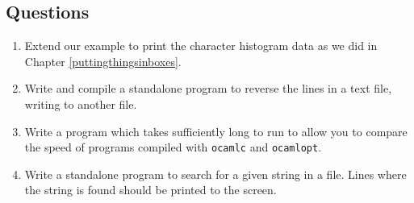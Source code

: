 \documentclass[]{book}
\begin{document}
\clearpage
\section*{Questions}

\begin{enumerate}
  \item Extend our example to print the character histogram data as we did in Chapter \ref{puttingthingsinboxes}. 
  \item Write and compile a standalone program to reverse the lines in a text file, writing to another file.
  \item Write a program which takes sufficiently long to run to allow you to compare the speed of programs compiled with \texttt{ocamlc} and \texttt{ocamlopt}.
  \item Write a standalone program to search for a given string in a file. Lines where the string is found should be printed to the screen.
\end{enumerate}

\cleardoublepage
\thispagestyle{empty}
\chapter*{}
\\
\end{document}
